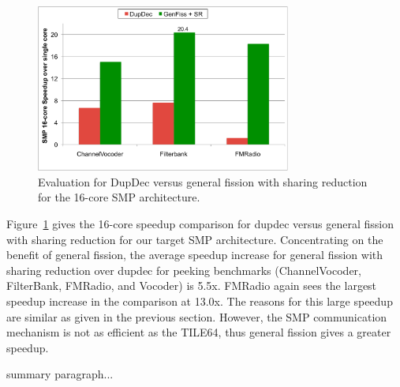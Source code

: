 \begin{figure}[t]
\centering
\includegraphics[width=3.3in]{figures/smp-chart.pdf}
\caption[Comparing the fission techniques on the 16-core SMP.]{
  Evaluation for DupDec versus general fission with sharing reduction
  for the 16-core SMP architecture.  \label{fig:smp-chart}}
\end{figure}

Figure~\ref{fig:smp-chart} gives the 16-core speedup comparison for
dupdec versus general fission with sharing reduction for our target
SMP architecture.  Concentrating on the benefit of general fission,
the average speedup increase for general fission with sharing
reduction over dupdec for peeking benchmarks (ChannelVocoder,
FilterBank, FMRadio, and Vocoder) is 5.5x.  FMRadio again sees the
largest speedup increase in the comparison at 13.0x.  The reasons for
this large speedup are similar as given in the previous section.
However, the SMP communication mechanism is not as efficient as the
TILE64, thus general fission gives a greater speedup.

summary paragraph...

